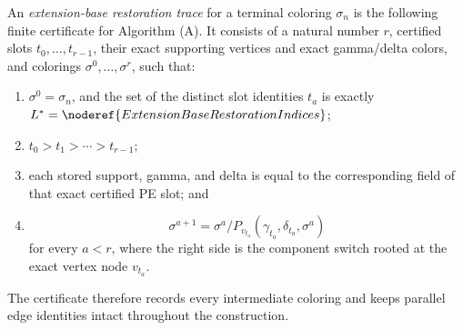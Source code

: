 \begin{definition}
An \emph{extension-base restoration trace} for a terminal coloring
\(\sigma_n\) is the following finite certificate for Algorithm (A).
It consists of a natural number \(r\), certified slots
\(t_0,\ldots,t_{r-1}\), their exact supporting vertices and exact
gamma/delta colors, and colorings
\(\sigma^0,\ldots,\sigma^r\), such that:
\begin{enumerate}
\item \(\sigma^0=\sigma_n\), and the set of the distinct slot identities
      \(t_a\) is exactly
      \(L^*=\noderef{ExtensionBaseRestorationIndices}\);
\item \(t_0>t_1>\cdots>t_{r-1}\);
\item each stored support, gamma, and delta is equal to the corresponding
      field of that exact certified PE slot; and
\item
\[
 \sigma^{a+1}=\sigma^a/
 P_{v_{t_a}}(\gamma_{t_a},\delta_{t_a},\sigma^a)
\]
      for every \(a<r\), where the right side is the component switch
       rooted at the exact vertex node
      \(v_{t_a}\).
\end{enumerate}
The certificate therefore records every intermediate coloring and keeps
parallel edge identities intact throughout the construction.
\end{definition}
